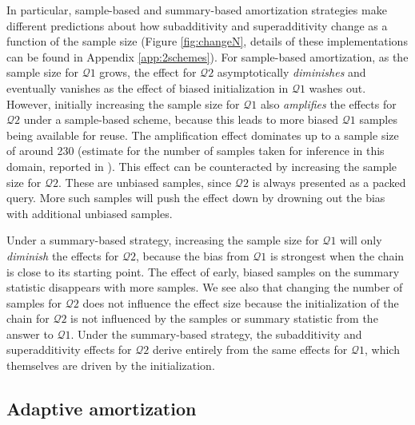 In particular, sample-based and summary-based amortization strategies make different predictions about how subadditivity and superadditivity change as a function of the sample size (Figure \ref{fig:changeN}, details of these implementations can be found in Appendix \ref{app:2schemes}).
For sample-based amortization, as the sample size for $\mathcal{Q}1$ grows, the effect for $\mathcal{Q}2$ asymptotically \emph{diminishes} and eventually vanishes as the effect of biased initialization in $\mathcal{Q}1$ washes out. However, initially increasing the sample size for $\mathcal{Q}1$ also \emph{amplifies} the effects for $\mathcal{Q}2$ under a sample-based scheme, because this leads to more biased $\mathcal{Q}1$ samples being available for reuse. The amplification effect dominates up to a sample size of around 230 (estimate for the number of samples taken for inference in this domain, reported in \citet{dasgupta2017hypotheses}). This effect can be counteracted by increasing the sample size for $\mathcal{Q}2$. These are unbiased samples, since $\mathcal{Q}2$ is always presented as a packed query. More such samples will push the effect down by drowning out the bias with additional unbiased samples. 

Under a summary-based strategy, increasing the sample size for $\mathcal{Q}1$ will only \emph{diminish} the effects for $\mathcal{Q}2$, because the bias from $\mathcal{Q}1$ is strongest when the chain is close to its starting point. The effect of early, biased samples on the summary statistic disappears with more samples. We see also that changing the number of samples for $\mathcal{Q}2$ does not influence the effect size because the initialization of the chain for $\mathcal{Q}2$ is not influenced by the samples or summary statistic from the answer to $\mathcal{Q}1$. Under the summary-based strategy, the subadditivity and superadditivity effects for $\mathcal{Q}2$ derive entirely from the same effects for $\mathcal{Q}1$, which themselves are driven by the initialization\citet{dasgupta2017hypotheses}.


\subsection{Adaptive amortization}

